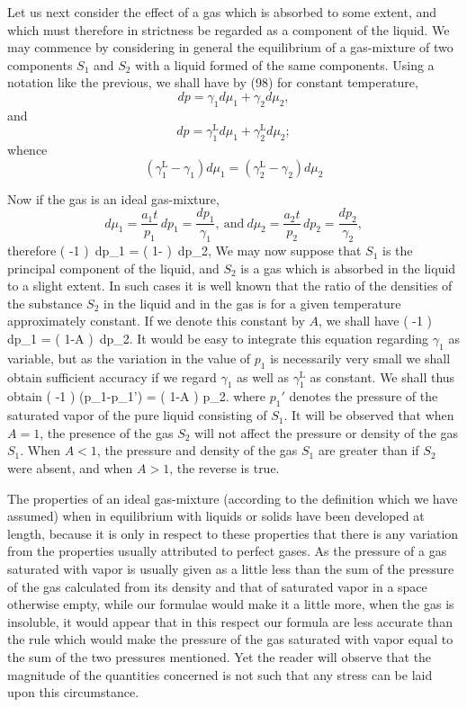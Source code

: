 \documentclass[12pt]{memoir}
\begin{document}
Let us next consider the effect of a gas which is absorbed to some extent, and which must therefore in strictness be regarded as a component of the liquid. We may commence by considering in general the equilibrium of a gas-mixture of two components $S_1$ and $S_2$ with a liquid formed of the same components. Using a notation like the previous, we shall have by (98) for constant temperature,
$$dp = \gamma_1 d \mu_1 + \gamma_2 d\mu_2,  $$
and                  $$dp = \gamma_1^{\text{L}} d \mu_1 + \gamma_2^{\text{L}} d\mu_2;$$
whence             $$(\gamma_1^\text{L} - \gamma_1) d\mu_1 = (\gamma_2^\text{L} - \gamma_2) d\mu_2$$

Now if the gas is an ideal gas-mixture,
$$ d \mu_1 = \frac{a_1 t}{p_1}  \, dp_1 = \frac{dp_1}{\gamma_1},  \ \text{and} \ d \mu_2 = \frac{a_2 t}{p_2}  \, dp_2  =\frac{dp_2}{\gamma_2},  $$
therefore
\eqs   \left(  -1 \right)\, dp_1 =  \left( 1-  \right)\, dp_2,     \label{288}\eqe
We may now suppose that $S_1$ is the principal component of the liquid, and $S_2$ is a gas which is absorbed in the liquid to a slight extent. In such cases it is well known that the ratio of the densities of the substance $S_2$ in the liquid and in the gas is for a given temperature approximately constant. If we denote this constant by $A$, we shall have
\eqs \left(  -1 \right)\, dp_1 =  \left( 1-A \right)\, dp_2.  \label{289}\eqe
It would be easy to integrate this equation regarding $\gamma_1$ as variable, but as the variation in the value of $p_1$ is necessarily very small we shall obtain sufficient accuracy if we regard $\gamma_1$ as well as $\gamma_1^\text{L}$ as constant. We shall thus obtain
\eqs  \left(  -1 \right) (p_1-p_1') =  \left( 1-A \right) p_2.  \label{290}\eqe
where $p_1'$ denotes the pressure of the saturated vapor of the pure liquid consisting of $S_1$. It will be observed that when $A =1$, the presence of the gas $S_2$ will not affect the pressure or density of the gas $S_1$. When $A < 1$, the pressure and density of the gas $S_1$ are greater than if $S_2$ were absent, and when $A > 1$, the reverse is true.


The properties of an ideal gas-mixture (according to the definition which we have assumed) when in equilibrium with liquids or solids have been developed at length, because it is only in respect to these properties that there is any variation from the properties usually attributed to perfect gases. As the pressure of a gas saturated with vapor is usually given as a little less than the sum of the pressure of the gas calculated from its density and that of saturated vapor in a space otherwise empty, while our formulae would make it a little more, when the gas is insoluble, it would appear that in this respect our formula are less accurate than the rule which would make the pressure of the gas saturated with vapor equal to the sum of the two pressures mentioned. Yet the reader will observe that the magnitude of the quantities concerned is not such that any stress can be laid upon this circumstance.
\end{document}

